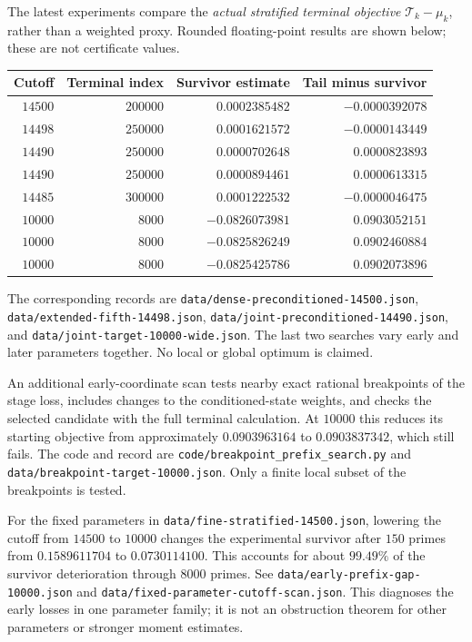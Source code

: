 \documentclass[11pt]{article}
\begin{document}
The latest experiments compare the \emph{actual stratified terminal
objective} $\mathcal T_k-\mu_k$, rather than a weighted proxy. Rounded
floating-point results are shown below; these are not certificate values.
\begin{center}
\begin{tabular}{rrrr}
\toprule
Cutoff & Terminal index & Survivor estimate & Tail minus survivor\\
\midrule
$14500$ & $200000$ & $0.0002385482$ & $-0.0000392078$\\
$14498$ & $250000$ & $0.0001621572$ & $-0.0000143449$\\
$14490$ & $250000$ & $0.0000702648$ & $0.0000823893$\\
$14490$ & $250000$ & $0.0000894461$ & $0.0000613315$\\
$14485$ & $300000$ & $0.0001222532$ & $-0.0000046475$\\
$10000$ & $8000$ & $-0.0826073981$ & $0.0903052151$\\
$10000$ & $8000$ & $-0.0825826249$ & $0.0902460884$\\
$10000$ & $8000$ & $-0.0825425786$ & $0.0902073896$\\
\bottomrule
\end{tabular}
\end{center}
The corresponding records are
\texttt{data/dense-preconditioned-14500.json},
\texttt{data/extended-fifth-14498.json},
\texttt{data/joint-preconditioned-14490.json}, and
\texttt{data/joint-target-10000-wide.json}. The last two searches vary
early and later parameters together. No local or global optimum is claimed.

An additional early-coordinate scan tests nearby exact rational breakpoints
of the stage loss, includes changes to the conditioned-state weights, and
checks the selected candidate with the full terminal calculation.
At $10000$ this reduces its starting objective from approximately
$0.0903963164$ to $0.0903837342$, which still fails. The code and record
are \texttt{code/breakpoint\_prefix\_search.py} and
\texttt{data/breakpoint-target-10000.json}. Only a finite local subset
of the breakpoints is tested.

For the fixed parameters in \texttt{data/fine-stratified-14500.json},
lowering the cutoff from $14500$ to $10000$ changes the experimental
survivor after $150$ primes from $0.1589611704$ to $0.0730114100$.
This accounts for about $99.49\%$ of the survivor deterioration through
$8000$ primes. See \texttt{data/early-prefix-gap-10000.json} and
\texttt{data/fixed-parameter-cutoff-scan.json}. This diagnoses the early
losses in one parameter family; it is not an obstruction theorem for
other parameters or stronger moment estimates.
\end{document}
